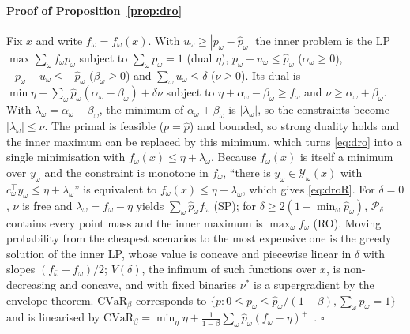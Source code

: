 \paragraph{Proof of Proposition~\ref{prop:dro}} Fix $x$ and write $f_\omega=f_\omega(x)$. With $u_\omega\ge|p_\omega-\hat
p_\omega|$ the inner problem is the LP $\max\sum_\omega f_\omega p_\omega$ subject to $\sum_\omega p_\omega=1$ (dual
$\eta$), $p_\omega-u_\omega\le\hat p_\omega$ ($\alpha_\omega\ge0$), $-p_\omega-u_\omega\le-\hat p_\omega$ ($\beta_\omega\ge0$)
and $\sum_\omega u_\omega\le\delta$ ($\nu\ge0$). Its dual is $\min\eta+\sum_\omega\hat p_\omega(\alpha_\omega-\beta_\omega)+\delta\nu$
subject to $\eta+\alpha_\omega-\beta_\omega\ge f_\omega$ and $\nu\ge\alpha_\omega+\beta_\omega$. With
$\lambda_\omega=\alpha_\omega-\beta_\omega$, the minimum of $\alpha_\omega+\beta_\omega$ is $|\lambda_\omega|$, so the
constraints become $|\lambda_\omega|\le\nu$. The primal is feasible ($p=\hat p$) and bounded, so strong duality holds and
the inner maximum can be replaced by this minimum, which turns \eqref{eq:dro} into a single minimisation with
$f_\omega(x)\le\eta+\lambda_\omega$. Because $f_\omega(x)$ is itself a minimum over $y_\omega$ and the constraint is
monotone in $f_\omega$, ``there is $y_\omega\in\mathcal Y_\omega(x)$ with $c_\omega^\top y_\omega\le\eta+\lambda_\omega$''
is equivalent to $f_\omega(x)\le\eta+\lambda_\omega$, which gives \eqref{eq:droR}. For $\delta=0$, $\nu$ is free and
$\lambda_\omega=f_\omega-\eta$ yields $\sum_\omega\hat p_\omega f_\omega$ (SP); for $\delta\ge2(1-\min_\omega\hat p_\omega)$,
$\mathcal P_\delta$ contains every point mass and the inner maximum is $\max_\omega f_\omega$ (RO). Moving probability
from the cheapest scenarios to the most expensive one is the greedy solution of the inner LP, whose value is concave and
piecewise linear in $\delta$ with slopes $(f_{\bar\omega}-f_\omega)/2$; $V(\delta)$, the infimum of such functions over
$x$, is non-decreasing and concave, and with fixed binaries $\nu^*$ is a supergradient by the envelope theorem.
$\mathrm{CVaR}_\beta$ corresponds to $\{p:0\le p_\omega\le\hat p_\omega/(1-\beta),\sum_\omega p_\omega=1\}$ and is linearised
by $\mathrm{CVaR}_\beta=\min_\eta\eta+\frac1{1-\beta}\sum_\omega\hat p_\omega(f_\omega-\eta)^+$~\cite{rockafellar2000}. $\square$

